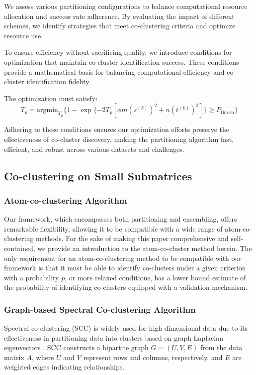 We assess various partitioning configurations to balance computational resource allocation and success rate adherence. By evaluating the impact of different schemes, we identify strategies that meet co-clustering criteria and optimize resource use.

To ensure efficiency without sacrificing quality, we introduce conditions for optimization that maintain co-cluster identification success. These conditions provide a mathematical basis for balancing computational efficiency and co-cluster identification fidelity.

The optimization must satisfy:
\begin{equation}
    \label{eq:optimization_condition}
    T_p = \text{argmin}_{T_p} \{
    1 - \exp \{ -2 T_p [\phi m (s^{(k)})^2 + n (t^{(k)})^2] \} \ge P_{\text{thresh}} \}
\end{equation}

Adhering to these conditions ensures our optimization efforts preserve the effectiveness of co-cluster discovery, making the partitioning algorithm fast, efficient, and robust across various datasets and challenges.

\subsection{Co-clustering on Small Submatrices}

\subsubsection{Atom-co-clustering Algorithm}
Our framework, which encompasses both partitioning and ensembling, offers remarkable flexibility, allowing it to be compatible with a wide range of atom-co-clustering methods. For the sake of making this paper comprehensive and self-contained, we provide an introduction to the atom-co-cluster method herein. The only requirement for an atom-co-clustering method to be compatible with our framework is that it must be able to identify co-clusters under a given criterion with a probability $p$, or more relaxed conditions, has a lower bound estimate of the probability of identifying co-clusters equipped with a validation mechanism.

\subsubsection{Graph-based Spectral Co-clustering Algorithm}
Spectral co-clustering (SCC) is widely used for high-dimensional data due to its effectiveness in partitioning data into clusters based on graph Laplacian eigenvectors \cite{vonluxburg2007TutorialSpectralClustering}. SCC constructs a bipartite graph $G=(U,V,E)$ from the data matrix $A$, where $U$ and $V$ represent rows and columns, respectively, and $E$ are weighted edges indicating relationships.

